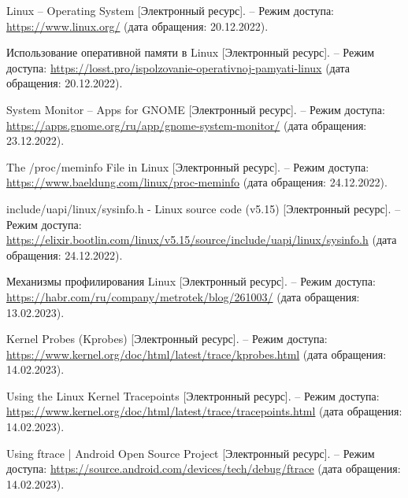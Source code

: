 
\begingroup
\renewcommand{\section}[2]{}
\begin{thebibliography}{}

Linux -- Operating System [Электронный ресурс]. -- Режим доступа: \url {https://www.linux.org/} (дата обращения: 20.12.2022).

Использование оперативной памяти в Linux [Электронный ресурс]. -- Режим доступа: \url {https://losst.pro/ispolzovanie-operativnoj-pamyati-linux} (дата обращения: 20.12.2022).

System Monitor – Apps for GNOME [Электронный ресурс]. -- Режим доступа: \url {https://apps.gnome.org/ru/app/gnome-system-monitor/} (дата обращения: 23.12.2022).

The /proc/meminfo File in Linux [Электронный ресурс]. -- Режим доступа: \url {https://www.baeldung.com/linux/proc-meminfo} (дата обращения: 24.12.2022).


include/uapi/linux/sysinfo.h - Linux source code (v5.15) [Электронный ресурс]. -- Режим доступа: \url {https://elixir.bootlin.com/linux/v5.15/source/include/uapi/linux/sysinfo.h} (дата обращения: 24.12.2022).


Механизмы профилирования Linux [Электронный ресурс]. -- Режим доступа: \url {https://habr.com/ru/company/metrotek/blog/261003/} (дата обращения: 13.02.2023).


Kernel Probes (Kprobes) [Электронный ресурс]. -- Режим доступа: \url {https://www.kernel.org/doc/html/latest/trace/kprobes.html} (дата обращения: 14.02.2023).


Using the Linux Kernel Tracepoints [Электронный ресурс]. -- Режим доступа: \url {https://www.kernel.org/doc/html/latest/trace/tracepoints.html} (дата обращения: 14.02.2023).


Using ftrace | Android Open Source Project [Электронный ресурс]. -- Режим доступа: \url {https://source.android.com/devices/tech/debug/ftrace} (дата обращения: 14.02.2023).


\end{thebibliography}
